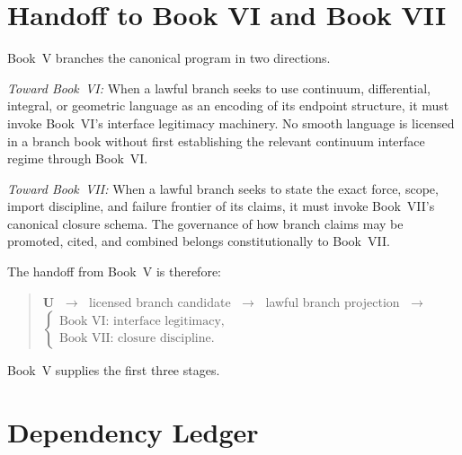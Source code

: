 \documentclass[12pt,oneside]{amsbook}
\theoremstyle{plain}
\theoremstyle{definition}
\theoremstyle{remark}
\begin{document}
\section{Handoff to Book VI and Book VII}

Book~V branches the canonical program in two directions.

\emph{Toward Book~VI:} When a lawful branch seeks to use continuum,
differential, integral, or geometric language as an encoding of its
endpoint structure, it must invoke Book~VI's interface legitimacy
machinery.  No smooth language is licensed in a branch book without
first establishing the relevant continuum interface regime through
Book~VI.

\emph{Toward Book~VII:} When a lawful branch seeks to state the exact
force, scope, import discipline, and failure frontier of its claims,
it must invoke Book~VII's canonical closure schema.  The governance of
how branch claims may be promoted, cited, and combined belongs
constitutionally to Book~VII.

The handoff from Book~V is therefore:
\begin{quote}
  $\mathbf{U}$
  $\;\longrightarrow\;$
  licensed branch candidate
  $\;\longrightarrow\;$
  lawful branch projection
  $\;\longrightarrow\;$
  $\begin{cases}
    \text{Book~VI: interface legitimacy,}\\
    \text{Book~VII: closure discipline.}
  \end{cases}$
\end{quote}
Book~V supplies the first three stages.

\section{Dependency Ledger}
\end{document}
